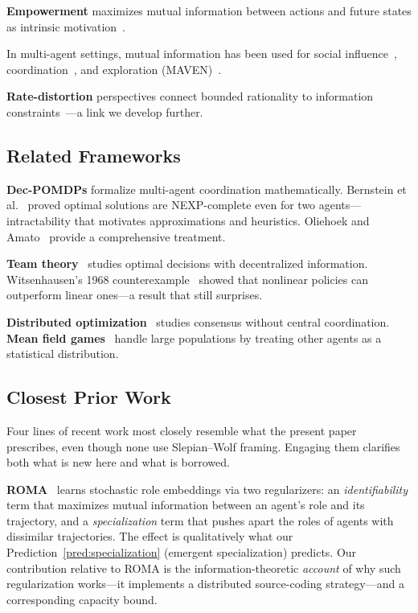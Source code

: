\documentclass[10pt, letterpaper]{article}
\begin{document}
\textbf{Empowerment} maximizes mutual information between actions and future states as intrinsic motivation~\cite{klyubin2005,mohamed2015empowerment,eysenbach2018diayn}.

In multi-agent settings, mutual information has been used for social influence~\cite{jaques2019social}, coordination~\cite{wang2020roma}, and exploration (MAVEN)~\cite{mahajan2019maven}.

\textbf{Rate-distortion} perspectives connect bounded rationality to information constraints~\cite{ortega2013,genewein2015}---a link we develop further.

\subsection{Related Frameworks}

\textbf{Dec-POMDPs} formalize multi-agent coordination mathematically. Bernstein et al.~\cite{bernstein2002} proved optimal solutions are NEXP-complete even for two agents---intractability that motivates approximations and heuristics. Oliehoek and Amato~\cite{oliehoek2016} provide a comprehensive treatment.

\textbf{Team theory}~\cite{marschak1972} studies optimal decisions with decentralized information. Witsenhausen's 1968 counterexample~\cite{witsenhausen1968} showed that nonlinear policies can outperform linear ones---a result that still surprises.

\textbf{Distributed optimization}~\cite{boyd2011admm,nedic2009distributed} studies consensus without central coordination. \textbf{Mean field games}~\cite{huang2006meanfield} handle large populations by treating other agents as a statistical distribution.

\subsection{Closest Prior Work}
\label{sec:closest-work}

Four lines of recent work most closely resemble what the present paper prescribes, even though none use Slepian--Wolf framing. Engaging them clarifies both what is new here and what is borrowed.

\textbf{ROMA}~\cite{wang2020roma} learns stochastic role embeddings via two regularizers: an \emph{identifiability} term that maximizes mutual information between an agent's role and its trajectory, and a \emph{specialization} term that pushes apart the roles of agents with dissimilar trajectories. The effect is qualitatively what our Prediction~\ref{pred:specialization} (emergent specialization) predicts. Our contribution relative to ROMA is the information-theoretic \emph{account} of why such regularization works---it implements a distributed source-coding strategy---and a corresponding capacity bound.
\end{document}

